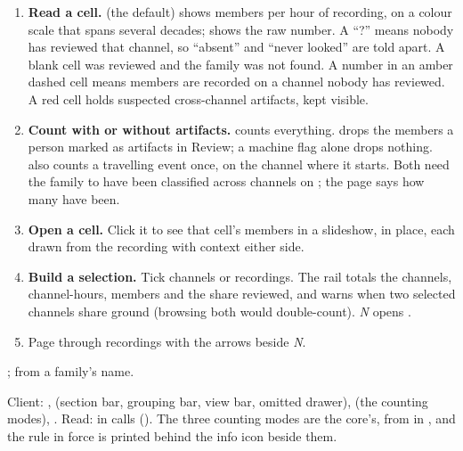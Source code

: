 \begin{enumerate}
  \item \textbf{Read a cell.}  (the default) shows members per hour of
    recording, on a colour scale that spans several decades;  shows the raw
    number. A ``?'' means nobody has reviewed that channel, so ``absent'' and ``never looked''
    are told apart. A blank cell was reviewed and the family was not found. A number in an
    amber dashed cell means members are recorded on a channel nobody has reviewed. A red
    cell holds suspected cross-channel artifacts, kept visible.
  \item \textbf{Count with or without artifacts.}  counts everything.
     drops the members a person marked as artifacts in Review; a
    machine flag alone drops nothing.  also counts a travelling
    event once, on the channel where it starts. Both need the family to have been classified
    across channels on ; the page says how many have been.
  \item \textbf{Open a cell.} Click it to see that cell's members in a slideshow, in place,
    each drawn from the recording with context either side.
  \item \textbf{Build a selection.} Tick channels or recordings. The rail totals the
    channels, channel-hours, members and the share reviewed, and warns when two selected
    channels share ground (browsing both would double-count).  \emph{N}
     opens .
  \item Page through recordings with the arrows beside  \emph{N}.
\end{enumerate}

;  from a family's name.

\begin{underthehood}[Recurrence]
Client: ,  (section bar,
grouping bar, view bar, omitted drawer),  (the counting modes),
. Read:  in
 calls 
(). The three counting modes are the core's, from
 in , and the rule in force is
printed behind the info icon beside them.
\end{underthehood}


